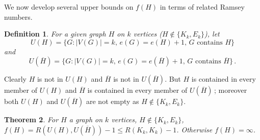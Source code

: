 \documentclass[a4paper,12pt]{article}
\newtheorem{theorem}{Theorem}[section]
\newtheorem{definition}[theorem]{Definition}
\begin{document}
We now develop several upper bounds on $f(H)$ in terms of related Ramsey numbers.


\begin{definition}
For a given graph $H$ on $k$ vertices ($H \notin \{K_k, E_k\}$), let \[U(H) = \{ G: |V(G)|=k, \, e(G)=e(H) +1, \, G \text{ contains } H \}\] and \[U(\overline{H}) = \{ G: |V(G)|=k, \, e(G)=e(\overline{H}) +1, \, G \text{ contains } \overline{H} \}\,.\]
\end{definition}

Clearly $H$ is not in $U(H)$ and $\overline{H}$ is not in $U(\overline{H})$.
But $H$ is contained in every member of $U(H)$ and $\overline{H}$ is contained in every member of $U(\overline{H})$\,; moreover both $U(H)$ and $U(\overline{H})$ are not empty as $H \notin \{K_k,E_k\}$.  

\begin{theorem}
 For $H$ a graph on $k$ vertices, $H \notin \{K_k,E_k\}$, $f(H) = R(U(H) , U(\overline{H}))-1 \leq R(K_k,K_k)-1$.  Otherwise $f(H)=\infty$.
\end{theorem}
\end{document}
